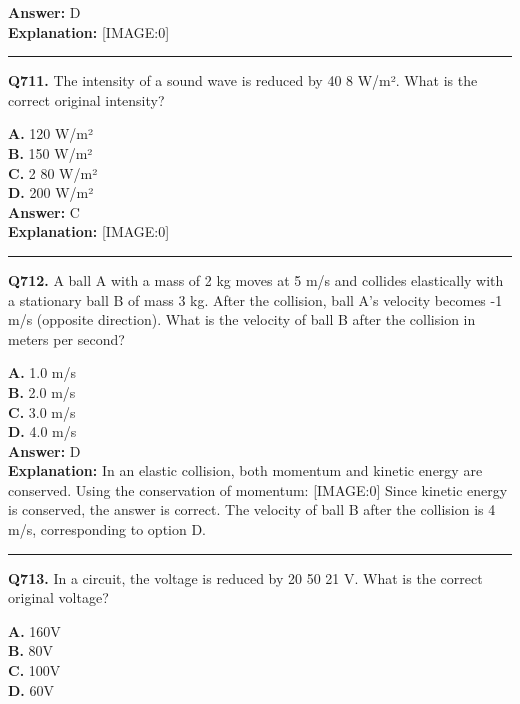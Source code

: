 \documentclass[12pt]{article}
\begin{document}
\textbf{Answer:} D \\
\textbf{Explanation:} [IMAGE:0]

\hrule
\vspace{1em}


\noindent
\textbf{Q711.} The intensity of a sound wave is reduced by 40%
8
W/m². What is the correct original intensity?



\textbf{A.} 120 W/m² \\
\textbf{B.} 150 W/m² \\
\textbf{C.} 2
80 W/m² \\
\textbf{D.} 200 W/m² \\

\textbf{Answer:} C \\
\textbf{Explanation:} [IMAGE:0]

\hrule
\vspace{1em}


\noindent
\textbf{Q712.} A ball A with a mass of 2 kg moves at 5 m/s and collides elastically with a stationary ball B of mass 3 kg. After the collision, ball A's velocity becomes -1 m/s (opposite direction). What is the velocity of ball B after the collision in meters per second?



\textbf{A.} 1.0 m/s \\
\textbf{B.} 2.0 m/s \\
\textbf{C.} 3.0 m/s \\
\textbf{D.} 4.0 m/s \\

\textbf{Answer:} D \\
\textbf{Explanation:} In an elastic collision, both momentum and kinetic energy are conserved. Using the conservation of momentum:
[IMAGE:0]
Since kinetic energy is conserved, the answer is correct. The velocity of ball B after the collision is 4 m/s, corresponding to option D.

\hrule
\vspace{1em}


\noindent
\textbf{Q713.} In a circuit, the voltage is reduced by 20%
50
21
V. What is the correct original voltage?



\textbf{A.} 160V \\
\textbf{B.} 80V \\
\textbf{C.} 100V \\
\textbf{D.} 60V \\
\end{document}
